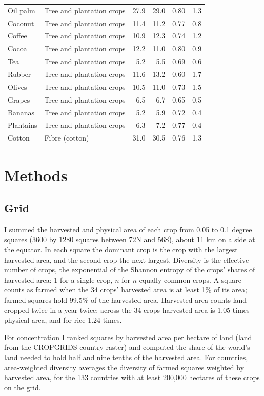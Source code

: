 \documentclass[11pt,a4paper]{article}
\begin{document}
\begin{table}[tbp]
\begin{tabular}{llrrrr}
Oil palm & Tree and plantation crops & 27.9 & 29.0 & 0.80 & 1.3\\
Coconut & Tree and plantation crops & 11.4 & 11.2 & 0.77 & 0.8\\
Coffee & Tree and plantation crops & 10.9 & 12.3 & 0.74 & 1.2\\
Cocoa & Tree and plantation crops & 12.2 & 11.0 & 0.80 & 0.9\\
Tea & Tree and plantation crops & 5.2 & 5.5 & 0.69 & 0.6\\
Rubber & Tree and plantation crops & 11.6 & 13.2 & 0.60 & 1.7\\
Olives & Tree and plantation crops & 10.5 & 11.0 & 0.73 & 1.5\\
Grapes & Tree and plantation crops & 6.5 & 6.7 & 0.65 & 0.5\\
Bananas & Tree and plantation crops & 5.2 & 5.9 & 0.72 & 0.4\\
Plantains & Tree and plantation crops & 6.3 & 7.2 & 0.77 & 0.4\\
Cotton & Fibre (cotton) & 31.0 & 30.5 & 0.76 & 1.3\\
\bottomrule\end{tabular}\end{table}

\section{Methods}
\subsection{Grid}
I summed the harvested and physical area of each crop from 0.05 to 0.1 degree squares (3600 by 1280 squares between 72\textdegree N and 56\textdegree S), about 11 km on a side at the equator. In each square the dominant crop is the crop with the largest harvested area, and the second crop the next largest. Diversity is the effective number of crops, the exponential of the Shannon entropy of the crops' shares of harvested area: 1 for a single crop, $n$ for $n$ equally common crops. A square counts as farmed when the 34 crops' harvested area is at least 1\% of its area; farmed squares hold 99.5\% of the harvested area. Harvested area counts land cropped twice in a year twice; across the 34 crops harvested area is 1.05 times physical area, and for rice 1.24 times.

For concentration I ranked squares by harvested area per hectare of land (land from the CROPGRIDS country raster) and computed the share of the world's land needed to hold half and nine tenths of the harvested area. For countries, area-weighted diversity averages the diversity of farmed squares weighted by harvested area, for the 133 countries with at least 200,000 hectares of these crops on the grid.
\end{document}
